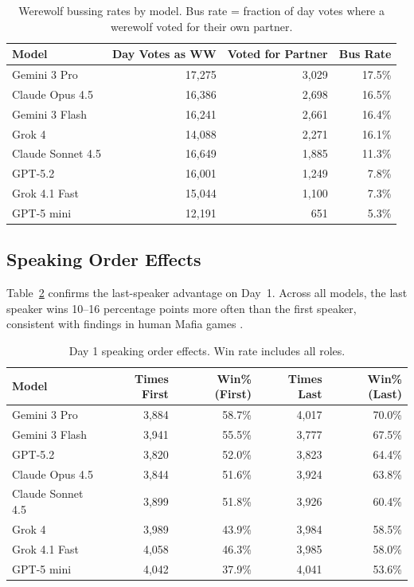 \begin{table}[ht]
\caption{Werewolf bussing rates by model. Bus rate = fraction of day votes where a werewolf voted for their own partner.}
\label{tab:bussing}
\centering
\small
\begin{tabular}{lrrr}
\toprule
\textbf{Model} & \textbf{Day Votes as WW} & \textbf{Voted for Partner} & \textbf{Bus Rate} \\
\midrule
Gemini 3 Pro            & 17,275 & 3,029 & 17.5\% \\
Claude Opus 4.5         & 16,386 & 2,698 & 16.5\% \\
Gemini 3 Flash          & 16,241 & 2,661 & 16.4\% \\
Grok 4                  & 14,088 & 2,271 & 16.1\% \\
Claude Sonnet 4.5       & 16,649 & 1,885 & 11.3\% \\
GPT-5.2                 & 16,001 & 1,249 &  7.8\% \\
Grok 4.1 Fast           & 15,044 & 1,100 &  7.3\% \\
GPT-5 mini              & 12,191 &   651 &  5.3\% \\
\bottomrule
\end{tabular}
\end{table}


\subsection{Speaking Order Effects}
\label{app:speaking_order}

Table~\ref{tab:speaking_order} confirms the last-speaker advantage on Day~1. Across all models, the last speaker wins 10--16 percentage points more often than the first speaker, consistent with findings in human Mafia games \citep{costa2025minimafia}.

\begin{table}[ht]
\caption{Day 1 speaking order effects. Win rate includes all roles.}
\label{tab:speaking_order}
\centering
\small
\begin{tabular}{lrrrr}
\toprule
\textbf{Model} & \textbf{Times First} & \textbf{Win\% (First)} & \textbf{Times Last} & \textbf{Win\% (Last)} \\
\midrule
Gemini 3 Pro            & 3,884 & 58.7\% & 4,017 & 70.0\% \\
Gemini 3 Flash          & 3,941 & 55.5\% & 3,777 & 67.5\% \\
GPT-5.2                 & 3,820 & 52.0\% & 3,823 & 64.4\% \\
Claude Opus 4.5         & 3,844 & 51.6\% & 3,924 & 63.8\% \\
Claude Sonnet 4.5       & 3,899 & 51.8\% & 3,926 & 60.4\% \\
Grok 4                  & 3,989 & 43.9\% & 3,984 & 58.5\% \\
Grok 4.1 Fast           & 4,058 & 46.3\% & 3,985 & 58.0\% \\
GPT-5 mini              & 4,042 & 37.9\% & 4,041 & 53.6\% \\
\bottomrule
\end{tabular}
\end{table}


